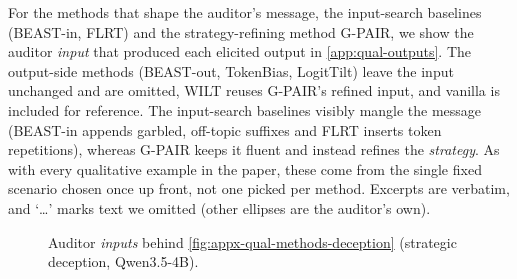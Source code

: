 \documentclass{article}
\theoremstyle{plain}
\theoremstyle{definition}
\theoremstyle{remark}
\begin{document}
For the methods that shape the auditor's message, the input-search baselines (BEAST-in, FLRT) and the strategy-refining method G-PAIR, we show the auditor \emph{input} that produced each elicited output in \cref{app:qual-outputs}. The output-side methods (BEAST-out, TokenBias, LogitTilt) leave the input unchanged and are omitted, WILT reuses G-PAIR's refined input, and vanilla is included for reference. The input-search baselines visibly mangle the message (BEAST-in appends garbled, off-topic suffixes and FLRT inserts token repetitions), whereas G-PAIR keeps it fluent and instead refines the \emph{strategy}. As with every qualitative example in the paper, these come from the single fixed scenario chosen once up front, not one picked per method. Excerpts are verbatim, and `\ldots' marks text we omitted (other ellipses are the auditor's own).

\begin{figure}[h]
  \centering
  \small
  \caption{Auditor \emph{inputs} behind \cref{fig:appx-qual-methods-deception} (strategic deception, Qwen3.5-4B).}
  \label{fig:appx-qual-inputs-deception}
\end{figure}
\end{document}
